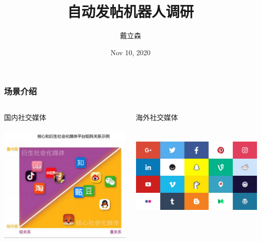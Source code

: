 \documentclass[10pt]{beamer}
\title{
    {自动发帖机器人调研}
}
\author{戴立森}
\date{Nov 10, 2020}
\begin{document}
    \maketitle
    \begin{frame}
        \frametitle{场景介绍}
        \begin{columns}
            \begin{column}{.4\linewidth}
                国内社交媒体 \\
                \hspace*{\fill} \\
                \includegraphics[scale=0.2]{src/img/Social_media_mainland.png}

            \end{column}
            \begin{column}{.4\linewidth}
                海外社交媒体 \\
                \hspace*{\fill} \\
                \hspace*{\fill} \\
                \includegraphics[scale=0.07]{src/img/Social_media_oversea.jpg}

            \end{column}

        \end{columns}
    \end{frame}
\end{document}
